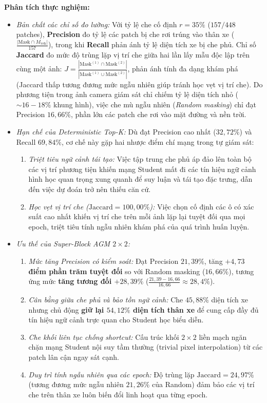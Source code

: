 \documentclass[11pt,a4paper]{article}
\begin{document}
\noindent
\textbf{Phân tích thực nghiệm:}
\begin{itemize}
    \item \textit{Bản chất các chỉ số đo lường:} Với tỷ lệ che cố định $r = 35\%$ ($157/448$ patches), \textbf{Precision} đo tỷ lệ các patch bị che rơi trúng vào thân xe ($\frac{|\text{Mask} \cap M_{\text{veh}}|}{157}$), trong khi \textbf{Recall} phản ánh tỷ lệ diện tích xe bị che phủ. Chỉ số \textbf{Jaccard} đo mức độ trùng lặp vị trí che giữa hai lần lấy mẫu độc lập trên cùng một ảnh: $J = \frac{|\text{Mask}^{(1)} \cap \text{Mask}^{(2)}|}{|\text{Mask}^{(1)} \cup \text{Mask}^{(2)}|}$, phản ánh tính đa dạng khám phá (Jaccard thấp tương đương mức ngẫu nhiên giúp tránh học vẹt vị trí che). Do phương tiện trong ảnh camera giám sát chỉ chiếm tỷ lệ diện tích nhỏ ($\sim 16 - 18\%$ khung hình), việc che mù ngẫu nhiên (\textit{Random masking}) chỉ đạt Precision $16{,}66\%$, phần lớn các patch che rơi vào mặt đường và nền trời.
    \item \textit{Hạn chế của Deterministic Top-K:} Dù đạt Precision cao nhất ($32{,}72\%$) và Recall $69{,}84\%$, cơ chế này gặp hai nhược điểm chí mạng trong tự giám sát:
    \begin{enumerate}
        \item \textit{Triệt tiêu ngữ cảnh tái tạo:} Việc tập trung che phủ áp đảo lên toàn bộ các vị trí phương tiện khiến mạng Student mất đi các tín hiệu ngữ cảnh hình học quan trọng xung quanh để suy luận và tái tạo đặc trưng, dẫn đến việc dự đoán trở nên thiếu căn cứ.
        \item \textit{Học vẹt vị trí che ($\text{Jaccard} = 100{,}00\%$):} Việc chọn cố định các ô có xác suất cao nhất khiến vị trí che trên mỗi ảnh lặp lại tuyệt đối qua mọi epoch, triệt tiêu tính ngẫu nhiên khám phá của quá trình huấn luyện.
    \end{enumerate}
    \item \textit{Ưu thế của Super-Block AGM $2 \times 2$:} 
    \begin{enumerate}
        \item \textit{Mức tăng Precision có kiểm soát:} Đạt Precision $21{,}39\%$, tăng \textbf{$+4{,}73$ điểm phần trăm tuyệt đối} so với Random masking ($16{,}66\%$), tương ứng mức \textbf{tăng tương đối $+28{,}39\%$} ($\frac{21{,}39 - 16{,}66}{16{,}66} \approx 28{,}4\%$).
        \item \textit{Cân bằng giữa che phủ và bảo tồn ngữ cảnh:} Che $45{,}88\%$ diện tích xe nhưng chủ động \textbf{giữ lại $54{,}12\%$ diện tích thân xe} để cung cấp đầy đủ tín hiệu ngữ cảnh trực quan cho Student học biểu diễn.
        \item \textit{Che khối liên tục chống shortcut:} Cấu trúc khối $2 \times 2$ liền mạch ngăn chặn mạng Student nội suy tầm thường (trivial pixel interpolation) từ các patch lân cận ngay sát cạnh.
        \item \textit{Duy trì tính ngẫu nhiên qua các epoch:} Độ trùng lặp $\text{Jaccard} = 24{,}97\%$ (tương đương mức ngẫu nhiên $21{,}26\%$ của Random) đảm bảo các vị trí che trên thân xe luôn biến đổi linh hoạt qua từng epoch.
    \end{enumerate}
\end{itemize}
\end{document}
